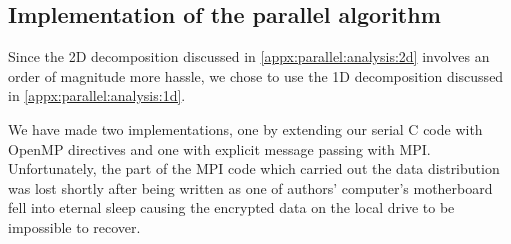 \subsection{Implementation of the parallel algorithm}
Since the 2D decomposition discussed in \ref{appx:parallel:analysis:2d} involves an order of magnitude more hassle, we chose to use the 1D decomposition discussed in \ref{appx:parallel:analysis:1d}.

We have made two implementations, one by extending our serial C code with OpenMP directives and one with explicit message passing with MPI.
Unfortunately, the part of the MPI code which carried out the data distribution was lost shortly after being written as one of authors' computer's motherboard fell into eternal sleep causing the encrypted data on the local drive to be impossible to recover.
